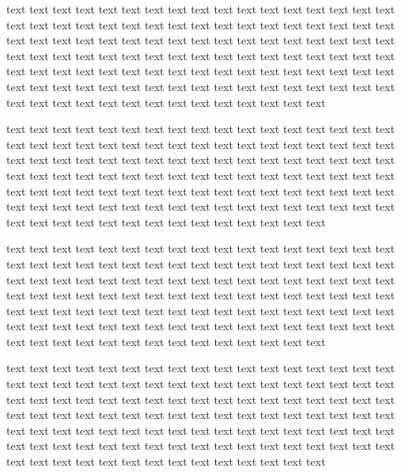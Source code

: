 \documentclass[12pt,a4paper,x11names,usenames,dvipsnames,svgnames,oneside]{book}
\def\skn{\tcbsubskin{skn}{empty}{frame code={\draw [black,transform canvas={xscale=1.5},decorate,decoration={zigzag,segment length=3mm,amplitude=.5mm},line width=1.3pt]([yshift=-5pt]frame.north west)--(frame.south west);}}}
\newenvironment{rem}{\skn\boxxr\tcbtitle}{\endboxxr}
\begin{document}
\begin{rem}
	text text text text text text text text text text text text text text text text text text text text text text text text text text text text text text text text text text text text text text text text text text text text text text text text text text text text text text text text text text text text text text text text text text text text text text text text text text text text text text text text text text text text text text text text text text text text text text text text text text text text text text text text text text text text text text text text text text text text
\end{rem}
\begin{thr}
text text text text text text text text text text text text text text text text text text text text text text text text text text text text text text text text text text text text text text text text text text text text text text text text text text text text text text text text text text text text text text text text text text text text text text text text text text text text text text text text text text text text text text text text text text text text text text text text text text text text text text text text text text text text text text text text text text text text
\end{thr}
\begin{dem}
text text text text text text text text text text text text text text text text text text text text text text text text text text text text text text text text text text text text text text text text text text text text text text text text text text text text text text text text text text text text text text text text text text text text text text text text text text text text text text text text text text text text text text text text text text text text text text text text text text text text text text text text text text text text text text text text text text text text
\end{dem}
\begin{exr}
	text text text text text text text text text text text text text text text text text text text text text text text text text text text text text text text text text text text text text text text text text text text text text text text text text text text text text text text text text text text text text text text text text text text text text text text text text text text text text text text text text text text text text text text text text text text text text text text text text text text text text text text text text text text text text text text text text text text text
\end{exr}
\end{document}
